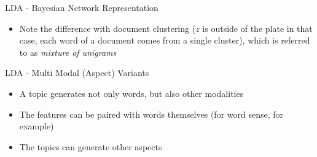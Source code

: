 \documentclass[pdf]{beamer}
\begin{document}
\begin{frame}{LDA - Bayesian Network Representation}
	\begin{itemize}
		\item Note the difference with document clustering ($z$ is outside of the plate in that case, each word of a document comes from a single cluster), which is referred to as \textit{mixture of unigrams}
	\end{itemize}
\end{frame}

\begin{frame}{LDA - Multi Modal (Aspect) Variants}
	\begin{itemize}
		\item A topic generates not only words, but also other modalities
		\item The features can be paired with words themselves (for word sense, for example)
		\item The topics can generate other aspects
	\end{itemize}
\end{frame}
\end{document}

